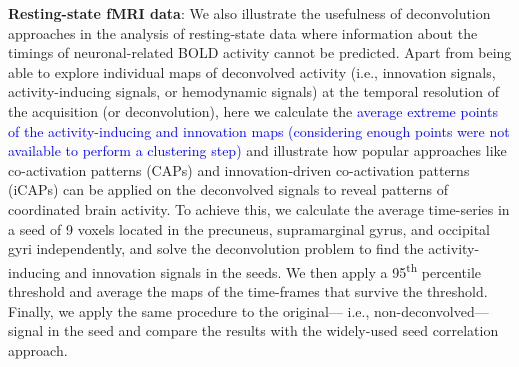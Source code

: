 \textbf{Resting-state fMRI data}: We also illustrate the usefulness of
deconvolution approaches in the analysis of resting-state data where information
about the timings of neuronal-related BOLD activity cannot be predicted. Apart
from being able to explore individual maps of deconvolved activity (i.e.,
innovation signals, activity-inducing signals, or hemodynamic signals) at the
temporal resolution of the acquisition (or deconvolution), here we calculate the
\textcolor{blue}{average extreme points of the activity-inducing and innovation
maps (considering enough points were not available to perform a clustering step)} 
and illustrate how popular approaches like co-activation patterns
(CAPs)\citep{Tagliazucchi2012,Liu2018Coactivationpatterns} and innovation-driven
co-activation patterns (iCAPs) \citep{Karahanoglu2015Transientbrainactivity} can
be applied on the deconvolved signals to reveal patterns of coordinated brain
activity. To achieve this, we calculate the average time-series in a seed of 9
voxels located in the precuneus, supramarginal gyrus, and occipital gyri
independently, and solve the deconvolution problem to find the activity-inducing
and innovation signals in the seeds. We then apply a 95\textsuperscript{th}
percentile threshold and average the maps of the time-frames that survive the
threshold. Finally, we apply the same procedure to the original--- i.e.,
non-deconvolved--- signal in the seed and compare the results with the
widely-used seed correlation approach.
